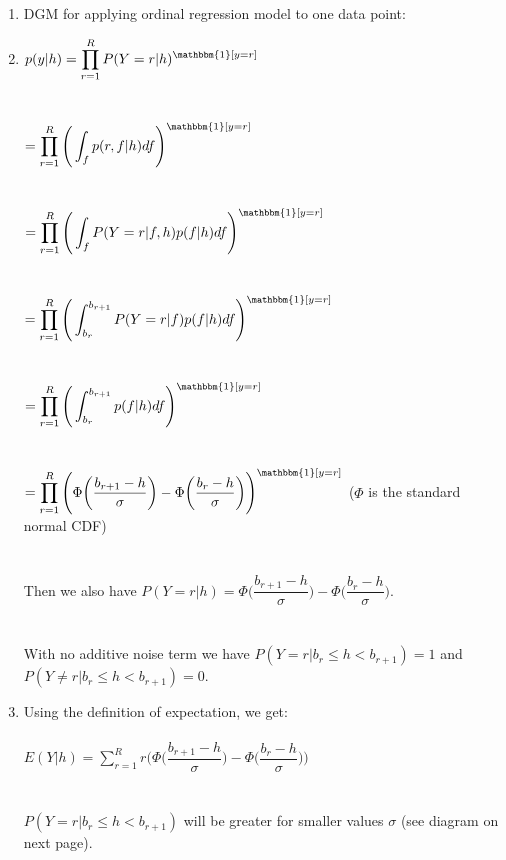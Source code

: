 \documentclass[10pt]{harvardml}
\theoremstyle{plain}
\begin{document}
\begin{enumerate}
\item DGM for applying ordinal regression model to one data point:
\begin{center}
\end{center}
\item $p(y|h)=\displaystyle\prod_{r=1}^RP(Y=r|h)^{\mathbbm{1}[y=r]}$\\\\\\
$=\displaystyle\prod_{r=1}^R\Bigg(\displaystyle\int_fp(r,f|h)df\Bigg)^{\mathbbm{1}[y=r]}$\\\\\\
$=\displaystyle\prod_{r=1}^R\Bigg(\displaystyle\int_fP(Y=r|f,h)p(f|h)df\Bigg)^{\mathbbm{1}[y=r]}$\\\\\\
$=\displaystyle\prod_{r=1}^R\Bigg(\int_{b_r}^{b_{r+1}}P(Y=r|f)p(f|h)df\Bigg)^{\mathbbm{1}[y=r]}$\\\\\\
$=\displaystyle\prod_{r=1}^R\Bigg(\int_{b_r}^{b_{r+1}}p(f|h)df\Bigg)^{\mathbbm{1}[y=r]}$\\\\\\
$=\displaystyle\prod_{r=1}^R\Bigg(\Phi\bigg(\dfrac{b_{r+1}-h}{\sigma}\bigg)-\Phi\bigg(\dfrac{b_r-h}{\sigma}\bigg)\Bigg)^{\mathbbm{1}[y=r]}$ ($\Phi$ is the standard normal CDF)\\\\\\
Then we also have $P(Y=r|h)=\Phi\bigg(\dfrac{b_{r+1}-h}{\sigma}\bigg)-\Phi\bigg(\dfrac{b_r-h}{\sigma}\bigg)$.\\\\\\
With no additive noise term we have $P(Y=r|b_r\leq h<b_{r+1})=1$ and $P(Y\neq r|b_r\leq h<b_{r+1})=0$.
\item Using the definition of expectation, we get:\\\\ $E(Y|h)=\displaystyle\sum_{r=1}^{R}r\Bigg(\Phi\bigg(\dfrac{b_{r+1}-h}{\sigma}\bigg)-\Phi\bigg(\dfrac{b_r-h}{\sigma}\bigg)\Bigg)$\\\\\\
$P(Y=r|b_r\leq h<b_{r+1})$ will be greater for smaller values $\sigma$ (see diagram on next page).


\end{enumerate}
\end{document}
